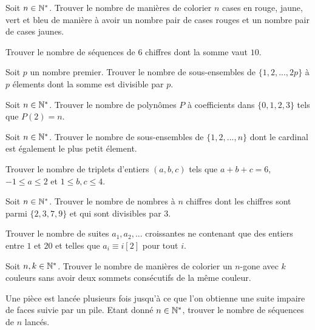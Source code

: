 \begin{exo}
Soit $n\in\mathbb N^*$. Trouver le nombre de manières de colorier $n$ cases en rouge, jaune, vert et bleu de manière à avoir un nombre pair de cases rouges et un nombre pair de cases jaunes.
\end{exo}


\begin{exo}
Trouver le nombre de séquences de $6$ chiffres dont la somme vaut $10$.
\end{exo}


\begin{exo}
Soit $p$ un nombre premier. Trouver le nombre de sous-ensembles de $\{1,2,...,2p\}$ à $p$ élements dont la somme est divisible par $p$.
\end{exo}


\begin{exo}
Soit $n\in\mathbb N^*$. Trouver le nombre de polynômes $P$ à coefficients dans $\{0, 1, 2, 3\}$ tels que $P(2) = n$.
\end{exo}


\begin{exo}
Soit $n\in\mathbb N^*$. Trouver le nombre de sous-ensembles de $\{1,2,...,n\}$ dont le cardinal est également le plus petit élement.
\end{exo}


\begin{exo}
Trouver le nombre de triplets d'entiers $(a,b,c)$ tels que $a+b+c=6$, $-1\leq a\leq 2$ et $1\leq b,c\leq 4$.
\end{exo}


\begin{exo}
Soit $n\in\mathbb N^*$. Trouver le nombre de nombres à $n$ chiffres dont les chiffres sont parmi $\{2,3,7,9\}$ et qui sont divisibles par $3$.
\end{exo}


\begin{exo}
Trouver le nombre de suites $a_1, a_2, ...$ croissantes ne contenant que des entiers entre $1$ et $20$ et telles que $a_i\equiv i[2]$ pour tout $i$.
\end{exo}


\begin{exo}
Soit $n,k\in\mathbb N^*$. Trouver le nombre de manières de colorier un $n$-gone avec $k$ couleurs sans avoir deux sommets consécutifs de la même couleur.
\end{exo}


\begin{exo}
Une pièce est lancée plusieurs fois jusqu'à ce que l'on obtienne une suite impaire de faces suivie par un pile. Etant donné $n\in\mathbb N^*$, trouver le nombre de séquences de $n$ lancés.
\end{exo}



